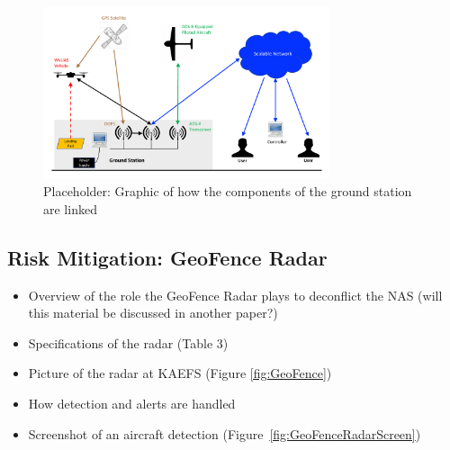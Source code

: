 \documentclass[sensors,review,submit,moreauthors,pdftex,10pt,a4paper]{mdpi}
\theoremstyle{mdpi}
\newcounter{ex}
\newcounter{re}
\theoremstyle{mdpidefinition}
\begin{document}
\begin{figure}
\centering
\includegraphics[angle=0, width=0.75\textwidth]{figures/conops.pdf}
\caption{\label{fig:GroundStation} Placeholder: Graphic of how the components of the ground station are linked}
\end{figure}

\subsection{Risk Mitigation: GeoFence Radar}
\begin{itemize}[leftmargin=*,labelsep=4mm]
\color{blue}
\item	Overview of the role the GeoFence Radar plays to deconflict the NAS (will this material be discussed in another paper?)
\item	Specifications of the radar (Table 3)
\item	Picture of the radar at KAEFS (Figure \ref{fig:GeoFence})
\item	How detection and alerts are handled
\item	Screenshot of an aircraft detection (Figure~\ref{fig:GeoFenceRadarScreen})
\end{itemize}
\end{document}

